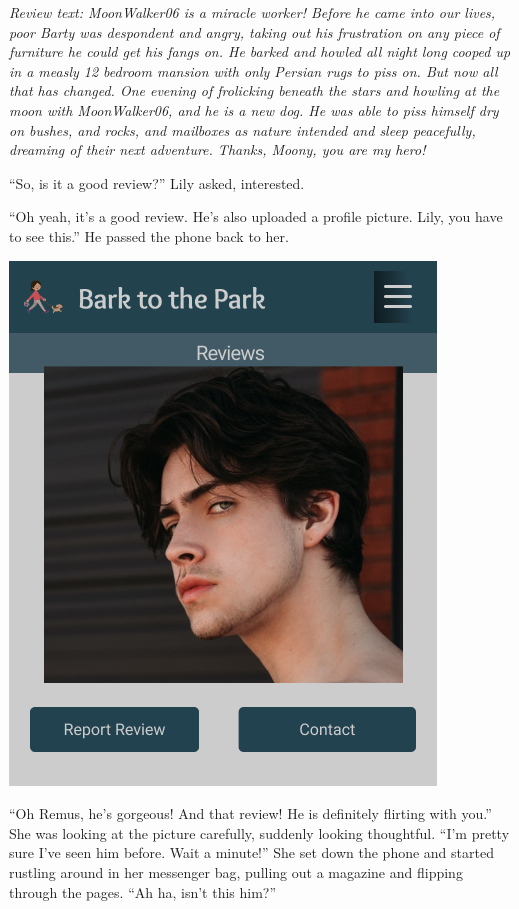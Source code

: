 \documentclass[12pt,twoside,openright]{memoir}
\begin{document}
\textit{Review text: MoonWalker06 is a miracle worker! Before he came into our lives, poor Barty was despondent and angry, taking out his frustration on any piece of furniture he could get his fangs on. He barked and howled all night long cooped up in a measly 12 bedroom mansion with only Persian rugs to piss on. But now all that has changed. One evening of frolicking beneath the stars and howling at the moon with MoonWalker06, and he is a new dog. He was able to piss himself dry on bushes, and rocks, and mailboxes as nature intended and sleep peacefully, dreaming of their next adventure. Thanks, Moony, you are my hero! }

``So, is it a good review?'' Lily asked, interested.

``Oh yeah, it's a good review. He's also uploaded a profile picture. Lily, you have to see this.'' He passed the phone back to her.

{\hfill\includegraphics[height=\textheight]{photo overlay}\hfill}

``Oh Remus, he's gorgeous! And that review! He is definitely flirting with you.'' She was looking at the picture carefully, suddenly looking thoughtful. ``I'm pretty sure I've seen him before. Wait a minute!'' She set down the phone and started rustling around in her messenger bag, pulling out a magazine and flipping through the pages. ``Ah ha, isn't this him?''
\end{document}
